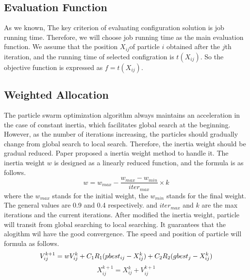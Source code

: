 \subsection{Evaluation Function}\label{subsec:evaluation}
\par As we known, The key criterion of evaluating configuration solution is job running time. Therefore, we will choose job running time as the main evaluation function. We assume that the position $X_{ij}$of particle $ \mathit{i} $ obtained after the $j$th iteration, and  the running time of selected configration is $t(X_{ij})$. So the objective function is expressed as $f=t(X_{ij})$.
\subsection{Weighted Allocation}\label{subsec:weight}
\par The particle swarm optimization algorithm always maintains an acceleration in the case of constant inertia, which facilitates global search at the beginning. However, as the number of iterations increasing, the particles should gradually change from global search to local search. Therefore, the inertia weight should be gradual reduced. Paper \cite{shi1999towards} proposed a inertia weight method to handle it. The inertia weight $w$ is designed as a linearly reduced function, and the formula is as follows.
\begin{equation}
w=w_{max}-\frac{w_{max}-w_{min}}{iter_{max}} \times k
\end{equation}
where the $ w_{max} $ stands for the initial weight, the $ w_{min} $ stands for the final weight. The general values are 0.9 and 0.4 respectively. and $ iter_{max} $ and $ k $ are the max iterations and the current iterations. After modified the inertia weight, particle will transit from global searching to local searching. It guarantees that the alogithm wil have the good convergence. The speed and position of particle will formula as follows.
\begin{equation}
\small
V^{k+1}_{ij} = wV^{k}_{ij} + C_1 R_1(pbest_{ij}-X^k_{ij}) + C_2 R_2 (gbest_j-X^k_{ij})
\end{equation}
\begin{equation}
X^{k+1}_{ij} = X^{k}_{ij} + V^{k+1}_{ij}
\end{equation}
